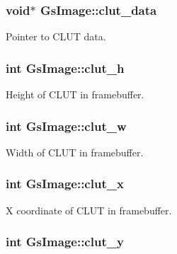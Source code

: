 \subsubsection[{clut\+\_\+data}]{\setlength{\rightskip}{0pt plus 5cm}void$\ast$ Gs\+Image\+::clut\+\_\+data}\label{structGsImage_a70b2875be1afa7d9b815004c1eea263f}


Pointer to C\+L\+U\+T data. 

\hypertarget{structGsImage_a26eca2ce5193f47874aada8354cafb80}{}
\subsubsection[{clut\+\_\+h}]{\setlength{\rightskip}{0pt plus 5cm}int Gs\+Image\+::clut\+\_\+h}\label{structGsImage_a26eca2ce5193f47874aada8354cafb80}


Height of C\+L\+U\+T in framebuffer. 

\hypertarget{structGsImage_a63347602889c710a8f2e21b71f82038f}{}
\subsubsection[{clut\+\_\+w}]{\setlength{\rightskip}{0pt plus 5cm}int Gs\+Image\+::clut\+\_\+w}\label{structGsImage_a63347602889c710a8f2e21b71f82038f}


Width of C\+L\+U\+T in framebuffer. 

\hypertarget{structGsImage_a95c9c337ddbe24c03106d5df8c35e526}{}
\subsubsection[{clut\+\_\+x}]{\setlength{\rightskip}{0pt plus 5cm}int Gs\+Image\+::clut\+\_\+x}\label{structGsImage_a95c9c337ddbe24c03106d5df8c35e526}


X coordinate of C\+L\+U\+T in framebuffer. 

\hypertarget{structGsImage_a9510563579c7ba86176a601d2adbe0c0}{}
\subsubsection[{clut\+\_\+y}]{\setlength{\rightskip}{0pt plus 5cm}int Gs\+Image\+::clut\+\_\+y}\label{structGsImage_a9510563579c7ba86176a601d2adbe0c0}


